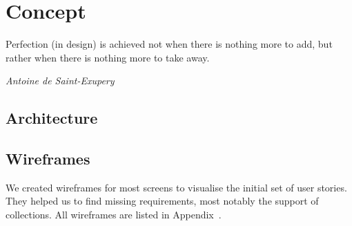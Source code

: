 \chapter{Concept} %
\epigraph{Perfection (in design) is achieved not when there is nothing more to add, but rather when there is nothing more to take away.}{\textit{Antoine de Saint-Exupery}}

\section{Architecture}

\section{Wireframes}

We created wireframes for most screens to visualise the initial set of user stories.
They helped us to find missing requirements, most notably the support of collections.
All wireframes are listed in Appendix~.
